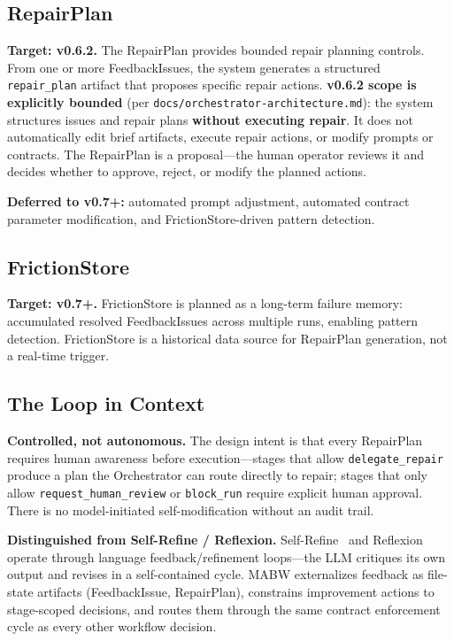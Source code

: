 \documentclass[11pt,a4paper]{article}
\begin{document}
\subsection{RepairPlan}

\textbf{Target: v0.6.2.} The RepairPlan provides bounded repair planning controls. From one or more FeedbackIssues, the system generates a structured \texttt{repair\_plan} artifact that proposes specific repair actions. \textbf{v0.6.2 scope is explicitly bounded} (per \texttt{docs/orchestrator-architecture.md}): the system structures issues and repair plans \textbf{without executing repair}. It does not automatically edit brief artifacts, execute repair actions, or modify prompts or contracts. The RepairPlan is a proposal---the human operator reviews it and decides whether to approve, reject, or modify the planned actions.

\textbf{Deferred to v0.7+:} automated prompt adjustment, automated contract parameter modification, and FrictionStore-driven pattern detection.

\subsection{FrictionStore}

\textbf{Target: v0.7+.} FrictionStore is planned as a long-term failure memory: accumulated resolved FeedbackIssues across multiple runs, enabling pattern detection. FrictionStore is a historical data source for RepairPlan generation, not a real-time trigger.

\subsection{The Loop in Context}

\textbf{Controlled, not autonomous.} The design intent is that every RepairPlan requires human awareness before execution---stages that allow \texttt{delegate\_repair} produce a plan the Orchestrator can route directly to repair; stages that only allow \texttt{request\_human\_review} or \texttt{block\_run} require explicit human approval. There is no model-initiated self-modification without an audit trail.

\textbf{Distinguished from Self-Refine / Reflexion.} Self-Refine~\cite{madaan2023selfrefine} and Reflexion operate through language feedback/refinement loops---the LLM critiques its own output and revises in a self-contained cycle. MABW externalizes feedback as file-state artifacts (FeedbackIssue, RepairPlan), constrains improvement actions to stage-scoped decisions, and routes them through the same contract enforcement cycle as every other workflow decision.
\end{document}

